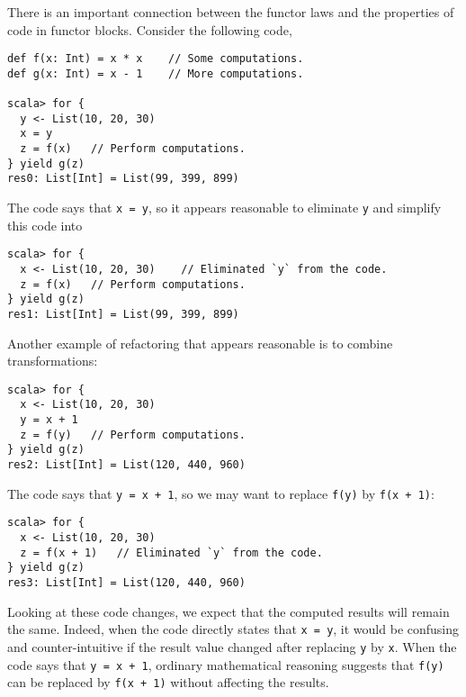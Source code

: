 There is an important connection between the functor laws and the
properties of code in functor blocks. Consider the following code,
\begin{lstlisting}
def f(x: Int) = x * x    // Some computations.
def g(x: Int) = x - 1    // More computations.

scala> for {
  y <- List(10, 20, 30)
  x = y
  z = f(x)   // Perform computations.
} yield g(z)
res0: List[Int] = List(99, 399, 899)
\end{lstlisting}
The code says that \lstinline!x = y!, so it appears reasonable to
eliminate \lstinline!y! and simplify this code into
\begin{lstlisting}
scala> for {
  x <- List(10, 20, 30)    // Eliminated `y` from the code.
  z = f(x)   // Perform computations.
} yield g(z)
res1: List[Int] = List(99, 399, 899)
\end{lstlisting}
Another example of refactoring that appears reasonable is to combine
transformations:
\begin{lstlisting}
scala> for {
  x <- List(10, 20, 30)
  y = x + 1
  z = f(y)   // Perform computations.
} yield g(z)
res2: List[Int] = List(120, 440, 960) 
\end{lstlisting}
The code says that \lstinline!y = x + 1!, so we may want to replace
\lstinline!f(y)! by \lstinline!f(x + 1)!:
\begin{lstlisting}
scala> for {
  x <- List(10, 20, 30)
  z = f(x + 1)   // Eliminated `y` from the code.
} yield g(z)
res3: List[Int] = List(120, 440, 960) 
\end{lstlisting}
Looking at these code changes, we expect that the computed results
will remain the same. Indeed, when the code directly states that \lstinline!x = y!,
it would be confusing and counter-intuitive if the result value changed
after replacing \lstinline!y! by \lstinline!x!. When the code says
that \lstinline!y = x + 1!, ordinary mathematical reasoning suggests
that \lstinline!f(y)! can be replaced by \lstinline!f(x + 1)! without
affecting the results.

